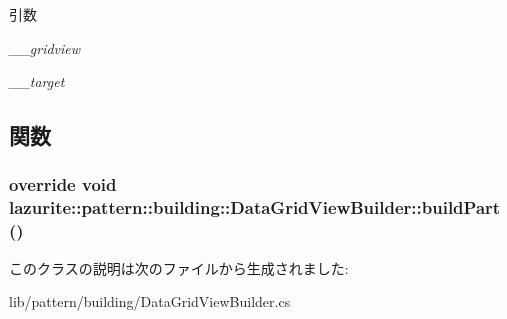 \begin{DoxyParams}{引数}
\item[{\em \_\-\_\-gridview}]\item[{\em \_\-\_\-target}]\end{DoxyParams}


\subsection{関数}
\hypertarget{classlazurite_1_1pattern_1_1building_1_1_data_grid_view_builder_a07cdde790aa83c3bede4fa12d05f4bb5}{
\subsubsection[{buildPart}]{\setlength{\rightskip}{0pt plus 5cm}override void lazurite::pattern::building::DataGridViewBuilder::buildPart ()}}
\label{classlazurite_1_1pattern_1_1building_1_1_data_grid_view_builder_a07cdde790aa83c3bede4fa12d05f4bb5}


このクラスの説明は次のファイルから生成されました:\begin{DoxyCompactItemize}
\item 
lib/pattern/building/DataGridViewBuilder.cs\end{DoxyCompactItemize}
